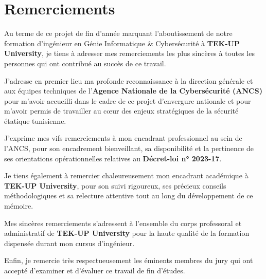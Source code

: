 \newpage
\thispagestyle{plain}
\chapter*{Remerciements}

\vspace{0.8cm}

Au terme de ce projet de fin d'année marquant l'aboutissement de notre formation d'ingénieur en Génie Informatique \& Cybersécurité à \textbf{TEK-UP University}, je tiens à adresser mes remerciements les plus sincères à toutes les personnes qui ont contribué au succès de ce travail.

\vspace{0.5cm}

J'adresse en premier lieu ma profonde reconnaissance à la direction générale et aux équipes techniques de l'\textbf{Agence Nationale de la Cybersécurité (ANCS)} pour m'avoir accueilli dans le cadre de ce projet d'envergure nationale et pour m'avoir permis de travailler au cœur des enjeux stratégiques de la sécurité étatique tunisienne.

\vspace{0.4cm}

J'exprime mes vifs remerciements à mon encadrant professionnel au sein de l'ANCS, pour son encadrement bienveillant, sa disponibilité et la pertinence de ses orientations opérationnelles relatives au \textbf{Décret-loi n° 2023-17}.

\vspace{0.4cm}

Je tiens également à remercier chaleureusement mon encadrant académique à \textbf{TEK-UP University}, pour son suivi rigoureux, ses précieux conseils méthodologiques et sa relecture attentive tout au long du développement de ce mémoire.

\vspace{0.4cm}

Mes sincères remerciements s'adressent à l'ensemble du corps professoral et administratif de \textbf{TEK-UP University} pour la haute qualité de la formation dispensée durant mon cursus d'ingénieur.

\vspace{0.4cm}

Enfin, je remercie très respectueusement les éminents membres du jury qui ont accepté d'examiner et d'évaluer ce travail de fin d'études.
